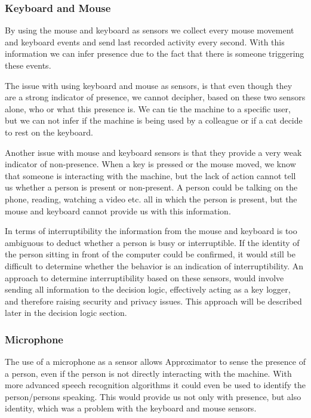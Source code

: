 \documentclass{sigchi}
\begin{document}
\subsubsection{Keyboard and Mouse}
By using the mouse and keyboard as sensors we collect every mouse movement and keyboard events and send last recorded activity every second.
With this information we can infer presence due to the fact that there is someone triggering these events.

The issue with using keyboard and mouse as sensors, is that even though they are a strong indicator of presence, we cannot decipher, based on these two sensors alone, who or what this presence is.
We can tie the machine to a specific user, but we can not infer if the machine is being used by a colleague or if a cat decide to rest on the keyboard.

Another issue with mouse and keyboard sensors is that they provide a very weak indicator of non-presence.
When a key is pressed or the mouse moved, we know that someone is interacting with the machine, but the lack of action cannot tell us whether a person is present or non-present.
A person could be talking on the phone, reading, watching a video etc. all in which the person is present, but the mouse and keyboard cannot provide us with this information.

In terms of interruptibility the information from the mouse and keyboard is too ambiguous to deduct whether a person is busy or interruptible.
If the identity of the person sitting in front of the computer could be confirmed, it would still be difficult to determine whether the behavior is an indication of interruptibility.
An approach to determine interruptibility based on these sensors, would involve sending all information to the decision logic, effectively acting as a key logger, and therefore raising security and privacy issues.
This approach will be described later in the decision logic section.

\subsubsection{Microphone}
The use of a microphone as a sensor allows Approximator to sense the presence of a person, even if the person is not directly interacting with the machine.
With more advanced speech recognition algorithms it could even be used to identify the person/persons speaking.
This would provide us not only with presence, but also identity, which was a problem with the keyboard and mouse sensors.
\end{document}
